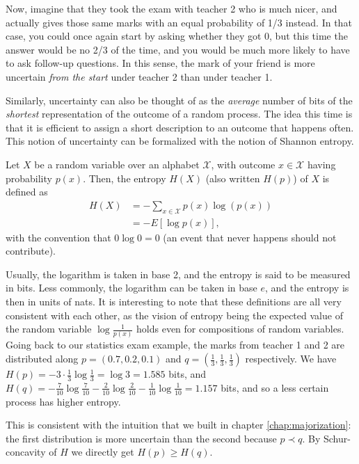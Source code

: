 Now, imagine that they took the exam with teacher 2 who is much nicer, and actually gives those same marks with an equal probability of 1/3 instead. In that case, you could once again start by asking whether they got 0, but this time the answer would be no 2/3 of the time, and you would be much more likely to have to ask follow-up questions. In this sense, the mark of your friend is more uncertain \textit{from the start} under teacher 2 than under teacher 1.

Similarly, uncertainty can also be thought of as the \textit{average} number of bits of the \textit{shortest} representation of the outcome of a random process. The idea this time is that it is efficient to assign a short description to an outcome that happens often. This notion of uncertainty can be formalized with the notion of Shannon entropy.

\begin{definition}
    Let $X$ be a random variable over an alphabet $\mathcal{X}$, with outcome $x \in \mathcal{X}$ having probability $p(x)$. Then, the entropy $H(X)$ (also written $H(p)$) of $X$ is defined as
    \begin{align}
        H(X) &= - \sum_{x \in \mathcal{X}} p(x) \log(p(x)) \\
             &= - E[\log p(x)],
    \end{align}
    with the convention that $0 \log 0 = 0$ (an event that never happens should not contribute).
\end{definition}

Usually, the logarithm is taken in base 2, and the entropy is said to be measured in bits. Less commonly, the logarithm can be taken in base $e$, and the entropy is then in units of nats. It is interesting to note that these definitions are all very consistent with each other, as the vision of entropy being the expected value of the random variable $\log \frac{1}{p(x)}$ holds even for compositions of random variables. Going back to our statistics exam example, the marks from teacher 1 and 2 are distributed along $p = (0.7, 0.2, 0.1)$ and $q = \left(\frac{1}{3}, \frac{1}{3}, \frac{1}{3}\right)$ respectively. We have $H(p) = - 3 \cdot \frac{1}{3} \log \frac{1}{3} = \log 3 = 1.585$ bits, and $H(q) = - \frac{7}{10} \log \frac{7}{10} - \frac{2}{10} \log \frac{2}{10} - \frac{1}{10} \log \frac{1}{10} = 1.157$ bits, and so a less certain process has higher entropy.

\begin{remark}
    This is consistent with the intuition that we built in chapter \ref{chap:majorization}: the first distribution is more uncertain than the second because $p \prec q$. By Schur-concavity of $H$ we directly get $H(p) \geq H(q)$.
\end{remark}

